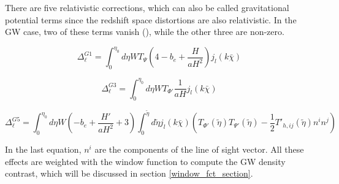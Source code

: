 There are five relativistic corrections, which can also be called gravitational potential terms since the redshift space distortions are also relativistic. In the GW case, two of these terms vanish (\cite{dallarmi_dipole_2022}), while the other three are non-zero.

\begin{equation}
    \Delta_\ell^{G1}=\int_0^{\eta_0} d\eta W T_\Psi \left(4-b_e+\frac{H}{aH^2}\right) j_l(k \bar{\chi})
\end{equation}

\begin{equation}
    \Delta_\ell^{G3}=\int_0^{\eta_0} d\eta W T_{\Phi'} \frac{1}{aH} j_l(k \bar{\chi})
\end{equation}

\begin{equation}
    \Delta_\ell^{G5}=\int_0^{\eta_0} d\eta W \left(-b_e + \frac{H'}{aH^2} +3\right) \int_0^{\tilde{\eta}} d\tilde{\eta} j_l(k \bar{\chi}) \left( T_{\Phi'}(\tilde{\eta})T_{\Psi'}(\tilde{\eta})-\frac{1}{2}T'_{h, ij}(\tilde{\eta})n^i n^j \right)
\end{equation}

In the last equation, $n^i$ are the components of the line of sight vector.
All these effects are weighted with the window function to compute the GW density contrast, which will be discussed in section \ref{window_fct_section}.


